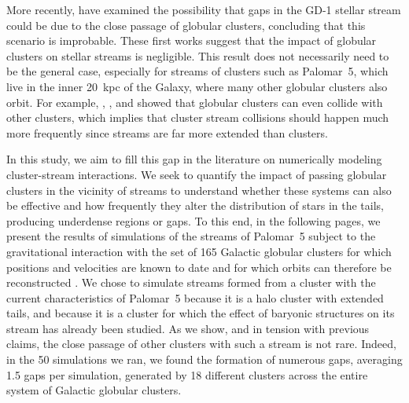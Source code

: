   More recently, \citet{2022ApJ...941..129D} have examined the possibility that gaps in the GD-1 stellar stream could be due to the close passage of globular clusters, concluding that this scenario is improbable. These first works suggest that the impact of globular clusters on stellar streams is negligible. This result does not necessarily need to be the general case, especially for streams of clusters such as Palomar~5, which live in the inner 20~kpc of the Galaxy, where many other globular clusters also orbit. For example, \citet{2018A&A...620A.154}, \citet{2019A&A...622A..86M}, and \citet{2023A&A...678A..69I} showed that globular clusters can even collide with other clusters, which implies that cluster stream collisions should happen much more frequently since streams are far more extended than clusters. 
  
  In this study, we aim to fill this gap in the literature on numerically modeling cluster-stream interactions. We seek to quantify the impact of passing globular clusters in the vicinity of streams to understand whether these systems can also be effective and how frequently they alter the distribution of stars in the tails, producing underdense regions or gaps. To this end, in the following pages, we present the results of simulations of the streams of Palomar~5 subject to the gravitational interaction with the set of 165 Galactic globular clusters for which positions and velocities are known to date and for which orbits can therefore be reconstructed \parencite{2021MNRAS.505.5957B}. We chose to simulate streams formed from a cluster with the current characteristics of Palomar~5 because it is a halo cluster with extended tails, and because it is a cluster for which the effect of baryonic structures on its stream has already been studied. As we show, and in tension with previous claims, the close passage of other clusters with such a stream is not rare. Indeed, in the 50 simulations we ran, we found the formation of numerous gaps, averaging 1.5 gaps per simulation, generated by 18 different clusters across the entire system of Galactic globular clusters.


